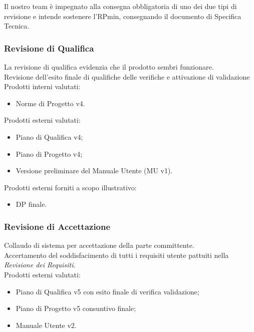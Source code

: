 \documentclass[12pt,a4paper,titlepage]{article}
\begin{document}
	Il nostro team è impegnato alla consegna obbligatoria di uno dei due tipi di revisione e intende sostenere l'RPmin, consegnando il documento di Specifica Tecnica.
	
	\subsubsection{Revisione di Qualifica}
	La revisione di qualifica evidenzia che il prodotto sembri funzionare. \\
	Revisione dell'esito finale di qualifiche delle verifiche e attivazione di validazione \\
	Prodotti interni valutati:
	\begin{itemize}
		\item Norme di Progetto v4.
	\end{itemize}
	Prodotti esterni valutati:
	\begin{itemize}
		\item Piano di Qualifica v4;
		\item Piano di Progetto v4;
		\item Versione preliminare del Manuale Utente (MU v1).
	\end{itemize}
	Prodotti esterni forniti a scopo illustrativo:
	\begin{itemize}
		\item DP finale.
	\end{itemize}
	
	\subsubsection{Revisione di Accettazione}
	Collaudo di sistema per accettazione della parte committente.\\
	Accertamento del soddisfacimento di tutti i requisiti utente pattuiti nella \textit{Revisione dei Requisiti}.\\
	Prodotti esterni valutati:
	\begin{itemize}
		\item Piano di Qualifica v5 con esito finale di verifica validazione;
		\item Piano di Progetto v5 consuntivo finale;
		\item Manuale Utente v2.
	\end{itemize}
	
	\newpage
	
\end{document}
